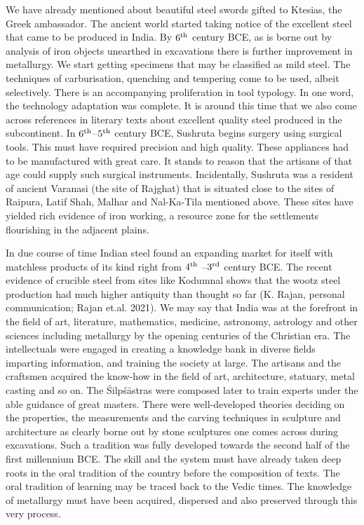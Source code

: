 We have already mentioned about beautiful steel swords gifted to Ktesias, the Greek ambassador. The ancient world started taking notice of the excellent steel that came to be produced in India. By $6^{\rm th}$ century BCE, as is borne out by analysis of iron objects unearthed in excavations there is further improvement in metallurgy. We start getting specimens that may be classified as mild steel. The techniques of carburisation, quenching and tempering come to be used, albeit selectively. There is an accompanying proliferation in tool typology. In one word, the technology adaptation was complete. It is around this time that we also come across references in literary texts about excellent quality steel produced in the subcontinent. In $6^{\rm th}$–$5^{\rm th}$ century BCE, Sushruta begins surgery using surgical tools. This must have required precision and high quality. These appliances had to be manufactured with great care. It stands to reason that the artisans of that age could supply such surgical instruments. Incidentally, Sushruta was a resident of ancient Varanasi (the site of Rajghat) that is situated close to the sites of Raipura, Latif Shah, Malhar and Nal-Ka-Tila mentioned above. These sites have yielded rich evidence of iron working, a resource zone for the settlements flourishing in the adjacent plains.   	

In due course of time Indian steel found an expanding market for itself with matchless products of its kind right from $4^{\rm th}$ –$3^{\rm rd}$ century BCE. The recent evidence of crucible steel from sites like Kodumnal shows that the wootz steel production had much higher antiquity than thought so far (K. Rajan, personal communication; Rajan et.al. 2021). We may say that India was at the forefront in the field of art, literature, mathematics, medicine, astronomy, astrology and other sciences including metallurgy by the opening centuries of the Christian era. The intellectuals were engaged in creating a knowledge bank in diverse fields imparting information, and training the society at large. The artisans and the craftsmen acquired the know-how in the field of art, architecture, statuary, metal casting and so on. The Śilpśāstras were composed later to train experts under the able guidance of great masters. There were well-developed theories deciding on the properties, the measurements and the carving techniques in sculpture and architecture as clearly borne out by stone sculptures one comes across during excavations. Such a tradition was fully developed towards the second half of the first millennium BCE. The skill and the system must have already taken deep roots in the oral tradition of the country before the composition of texts. The oral tradition of learning may be traced back to the Vedic times. The knowledge of metallurgy must have been acquired, dispersed and also preserved through this very process. 

